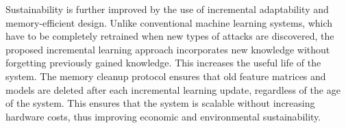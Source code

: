 Sustainability is further improved by the use of incremental adaptability and memory-efficient design. Unlike conventional machine learning systems, which have to be completely retrained when new types of attacks are discovered, the proposed incremental learning approach incorporates new knowledge without forgetting previously gained knowledge. This increases the useful life of the system. The memory cleanup protocol ensures that old feature matrices and models are deleted after each incremental learning update, regardless of the age of the system. This ensures that the system is scalable without increasing hardware costs, thus improving economic and environmental sustainability.